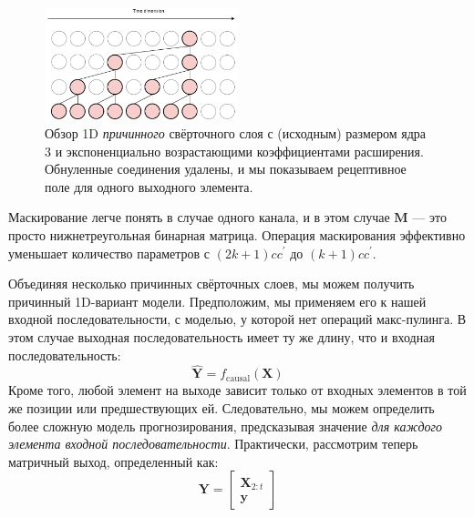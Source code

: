 \begin{figure}
    \centering
    \hspace{1em}\includegraphics[width=0.5\textwidth]{images/causal_convolutions}
    \caption{Обзор 1D \textit{причинного} свёрточного слоя с (исходным) размером ядра $3$ и экспоненциально возрастающими коэффициентами расширения. Обнуленные соединения удалены, и мы показываем рецептивное поле для одного выходного элемента.}
    \label{fig:causal_convolutions}
\end{figure}

Маскирование легче понять в случае одного канала, и в этом случае $\mathbf{M}$ — это просто нижнетреугольная бинарная матрица. Операция маскирования эффективно уменьшает количество параметров с $(2k+1)cc^\prime$ до $(k+1)cc^\prime$. 

Объединяя несколько причинных свёрточных слоев, мы можем получить причинный 1D-вариант модели. Предположим, мы применяем его к нашей входной последовательности, с моделью, у которой нет операций макс-пулинга. В этом случае выходная последовательность имеет ту же длину, что и входная последовательность:
%
$$
\widehat{\mathbf{Y}} = f_{\text{causal}}(\mathbf{X})
$$
%
Кроме того, любой элемент на выходе зависит только от входных элементов в той же позиции или предшествующих ей. Следовательно, мы можем определить более сложную модель прогнозирования, предсказывая значение \textit{для каждого элемента входной последовательности}. Практически, рассмотрим теперь матричный выход, определенный как:
%
$$
\mathbf{Y} = \begin{bmatrix} \mathbf{X}_{2:t} \\\mathbf{y} \end{bmatrix}
$$


